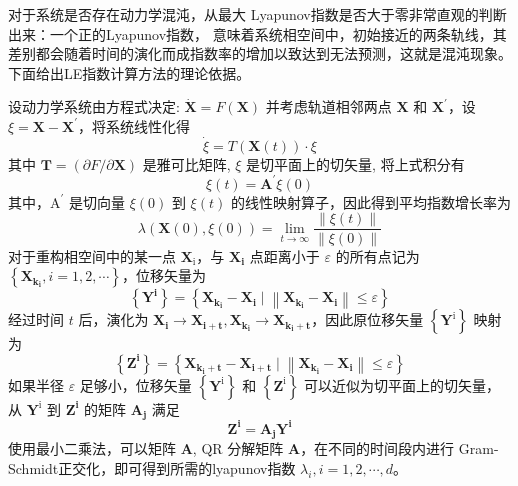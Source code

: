 对于系统是否存在动力学混沌，从最大 Lyapunov指数是否大于零非常直观的判断出来：一个正的Lyapunov指数，
意味着系统相空间中，初始接近的两条轨线，其差别都会随着时间的演化而成指数率的增加以致达到无法预测，这就是混沌现象。
下面给出LE指数计算方法的理论依据。\par
设动力学系统由方程式决定: $\dot{\mathbf{X}}=F(\mathbf{X})$
并考虑轨道相邻两点 $\mathbf{X}$ 和 $\mathbf{X}^{\prime}$，设$\xi=\mathbf{X}-\mathbf{X}^{\prime}$，将系统线性化得
\begin{equation}
    \dot{\xi}=T(\mathbf{X}(t)) \cdot \xi
\end{equation}
其中 $\mathbf{T}=(\partial F / \partial \mathbf{X})$ 是雅可比矩阵, $\xi$ 是切平面上的切矢量, 将上式积分有
\begin{equation}
    \xi(t)=\mathbf{A}^{\prime} \xi(0)
\end{equation}
其中，$\mathrm{A}^{\prime}$ 是切向量 $\xi(0)$ 到 $\xi(t)$ 的线性映射算子，因此得到平均指数增长率为
\begin{equation}
    \lambda(\mathbf{X}(0), \xi(0))=\lim _{t \rightarrow \infty} \frac{\|\xi(t)\|}{\|\xi(0)\|}
\end{equation}
对于重构相空间中的某一点 $\mathbf{X}_{\mathrm{i}}$，与 $\mathbf{X}_{\mathbf{i}}$ 点距离小于 $\varepsilon$ 的所有点记为 $\left\{\mathbf{X}_{\mathbf{k}_{\mathbf{i}}}, i=1,2, \cdots\right\}$，位移矢量为 
\begin{equation}
    \left\{\mathbf{Y}^{\mathbf{i}}\right\}=\left\{\mathbf{X}_{\mathbf{k}_{\mathbf{i}}}-\mathbf{X}_{\mathbf{i}} \mid\left\|\mathbf{X}_{\mathbf{k}_{\mathbf{i}}}-\mathbf{X}_{\mathbf{i}}\right\| \leq \varepsilon\right\} 
\end{equation}
经过时间 $t$ 后，演化为 $\mathbf{X}_{\mathbf{i}} \rightarrow \mathbf{X}_{\mathbf{i + t}}, \mathbf{X}_{\mathbf{k}_{\mathbf{i}}} \rightarrow \mathbf{X}_{\mathbf{k}_{\mathbf{i}}+\mathbf{t}}$，因此原位移矢量 $\left\{\mathbf{Y}^{\mathrm{i}}\right\}$ 映射为
\begin{equation}
    \left\{\mathbf{Z}^{\mathbf{i}}\right\}=\left\{\mathbf{X}_{\mathbf{k}_{\mathbf{i}}+\mathbf{t}}-\mathbf{X}_{\mathbf{i}+\mathbf{t}} \mid\left\|\mathbf{X}_{\mathbf{k}_{\mathbf{i}}}-\mathbf{X}_{\mathbf{i}}\right\| \leq \varepsilon\right\}
\end{equation}
如果半径 $\varepsilon$ 足够小，位移矢量 $\left\{\mathbf{Y}^{\mathrm{i}}\right\}$ 和 $\left\{\mathbf{Z}^{\mathrm{i}}\right\}$ 可以近似为切平面上的切矢量，从 $\mathbf{Y}^{\mathrm{i}}$ 到 $\mathbf{Z}^{\mathbf{i}}$ 的矩阵 $\mathbf{A}_{\mathbf{j}}$ 满足
\begin{equation}
    \mathbf{Z}^{\mathbf{i}}=\mathbf{A}_{\mathbf{j}} \mathbf{Y}^{\mathbf{i}}
\end{equation}
使用最小二乘法，可以矩阵 $\mathbf{A}$, $\mathrm{QR}$ 分解矩阵 $\mathbf{A}$，在不同的时间段内进行 Gram-Schmidt正交化，即可得到所需的lyapunov指数 $\lambda_{i}, i=1,2, \cdots, d$。\par
